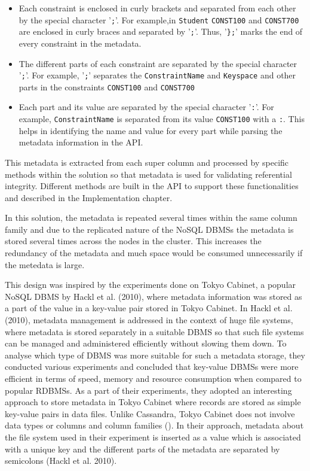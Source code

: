 		\begin{itemize}
			\item Each constraint is enclosed in curly brackets and separated from each
			other by the special character '\texttt{;}'. For example,in \texttt{Student}
			\texttt{CONST100} and \texttt{CONST700} are enclosed in curly braces and
			separated by '\texttt{;}'. Thus, '\texttt{\};}' marks the end of every
			constraint in the metadata.
		
		
			\item The different parts of each constraint are separated by the special character
			'\texttt{;}'. For example,  '\texttt{;}' separates the \texttt{ConstraintName}
			 and \texttt{Keyspace} and other parts in the constraints \texttt{CONST100} and
			 \texttt{CONST700}
			 
			 
			\item Each part and its value are separated by the special character
			'\texttt{:}'. For example, \texttt{ConstraintName} is separated from
			its value \texttt{CONST100} with a \texttt{:}. This helps in identifying the
			name and value for every part while parsing the metadata information
			in the \ac{API}.
			
		\end{itemize}
This metadata is extracted from each super column and processed by specific
methods within the solution so that metadata is used for validating referential
integrity. Different methods are built in the \ac{API} to support these
functionalities and described in the Implementation chapter.

In this solution, the metadata is  repeated several times within the
same column family and due to the replicated nature of the \ac{NoSQL} \acp{DBMS}
the metadata is  stored several times across the nodes in the cluster. This
increases the redundancy of the metadata and much space would be consumed
unnecessarily if the metedata is large. 

This design was inspired by the experiments done on Tokyo Cabinet, a popular
\ac{NoSQL} \ac{DBMS} by Hackl et al.  (2010), where metadata information was
stored as a part of the value in a key-value pair stored in Tokyo Cabinet. In
Hackl et al.  (2010),  metadata management is addressed in the context of huge
file systems, where metadata is stored separately in a suitable \ac{DBMS} so
that such file systems can be managed and administered efficiently without
slowing them down.  To analyse which type of \ac{DBMS} was more suitable for
such a metadata storage,  they conducted various experiments and concluded that
key-value \acp{DBMS} were more efficient in terms of speed,  memory and resource
consumption when compared to popular \acp{RDBMS}.  As a part of their
experiments, they adopted an interesting approach to store metadata in  Tokyo
Cabinet where records are stored as simple key-value
pairs in data files. Unlike Cassandra, Tokyo Cabinet does not involve data types
or columns and column families ().
In their approach,  metadata about the file system used in their experiment is
inserted as a value which is associated with a unique key and the different
parts of the metadata are separated by semicolons (Hackl et al.  2010).


